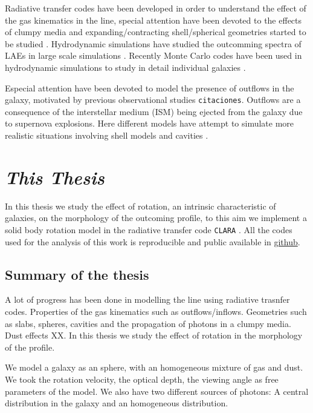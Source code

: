 Radiative transfer codes \citep{DijkstraKramer, Laursen09, Verhamme06, CLARA} 
have been developed in order to understand the effect of the gas kinematics in 
the \lya line, special attention have been devoted to the effects of clumpy 
media \citep{Hansen06} and expanding/contracting shell/spherical geometries 
started to be studied \citep{Ahn03,Verhamme06,Dijkstra06}. 
Hydrodynamic simulations have studied the outcomming spectra of 
LAEs in large scale simulations \cite{Forero12}. Recently Monte Carlo codes have 
been used in hydrodynamic simulations to study in detail individual galaxies 
\citep{Laursen09,Barnes11,Verhamme12,Yajima12}.

Especial attention have been devoted to model the presence of outflows in the galaxy, 
motivated by previous observational studies \verb+citaciones+. 
Outflows are a consequence of the interstellar medium (ISM) being ejected 
from the galaxy due to supernova explosions. Here different models have 
attempt to simulate more realistic situations involving shell models and cavities \citep{Behrens2014}.


\section{\emph{This Thesis}}

In this thesis we study the effect of rotation, an intrinsic
 characteristic of galaxies, on the morphology
of the \lya outcoming profile, to this aim we implement a solid body
rotation model in the radiative transfer code \verb+CLARA+ \citep{CLARA}.
All the codes used for the analysis of this work is reproducible
and public available in \href{https://github.com/jngaravitoc/RotationLyAlpha}{github}.

\subsection{Summary of the thesis}

A lot of progress has been done in modelling the \ly line using radiative
trasnfer codes. Properties of the gas kinematics such as outflows/inflows. 
Geometries such as slabs, spheres, cavities and the propagation of \ly photons
in a clumpy media. Dust effects XX. In this thesis we study the effect 
of rotation in the morphology of the \ly profile.  

We model a galaxy as an sphere, with an homogeneous mixture of gas and dust. 
We took the rotation velocity, the optical depth, the viewing angle as free
parameters of the model. We also have two different sources of \ly photons:
A central distribution in the galaxy and an homogeneous distribution. 

